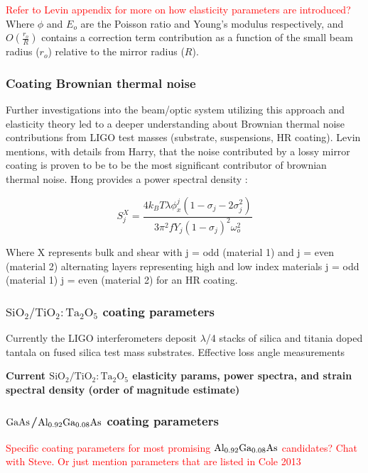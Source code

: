 \textcolor{red}{Refer to Levin appendix for more on how elasticity parameters are introduced?} Where $\phi$ and $E_o$ are the Poisson ratio and Young's modulus respectively, and $O(\frac{r_o}{R})$ contains a correction term contribution as a function of the small beam radius ($r_o$) relative to the mirror radius ($R$).

\subsubsection{Coating Brownian thermal noise}
Further investigations into the beam/optic system utilizing this approach and elasticity theory led to a deeper understanding about Brownian thermal noise contributions from LIGO test masses (substrate, suspensions, HR coating). Levin mentions, with details from Harry, that the noise contributed by a lossy mirror coating is proven to be to be the most significant contributor of brownian thermal noise. Hong provides a power spectral density \cite{Hong:2013}:

\begin{equation}
S_j^X = \frac{4k_B T \lambda \phi_x^j(1- \sigma_j - 2 \sigma_j^2)}{3 \pi^2 f Y_j (1-\sigma_j)^2 \omega_o^2}
\end{equation}

Where X represents bulk and shear with j = odd (material 1) and j = even (material 2) alternating layers representing high and low index materials j = odd (material 1) j = even (material 2) for an HR coating.

\subsubsection{$\mathrm{SiO_2}/\mathrm{TiO_2:Ta_2O_5}$ coating parameters}
Currently the LIGO interferometers deposit $\lambda$/4 stacks of silica and titania doped tantala on fused silica test mass substrates. Effective loss angle measurements \cite{Harry:06}

\textbf{Current $\mathrm{SiO_2}/\mathrm{TiO_2:Ta_2O_5}$ elasticity params, power spectra, and strain spectral density (order of magnitude estimate)}

\subsubsection{$\mathrm{GaAs}$/$\mathrm{Al_{0.92}Ga_{0.08}As}$ coating parameters}
\textcolor{red}{Specific coating parameters for most promising $\mathrm{Al_{0.92}Ga_{0.08}As}$ candidates? Chat with Steve. Or just mention parameters that are listed in Cole 2013}
\cite{Cole:2013}

